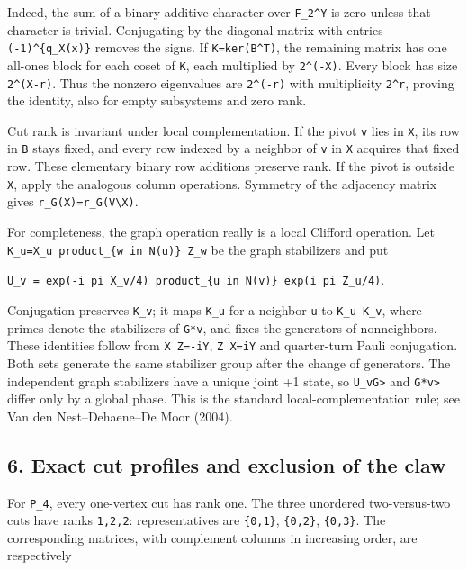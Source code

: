 \documentclass[
  11pt,
]{article}
\begin{document}
Indeed, the sum of a binary additive character over \texttt{F\_2\^{}Y}
is zero unless that character is trivial. Conjugating by the diagonal
matrix with entries \texttt{(-1)\^{}\{q\_X(x)\}} removes the signs. If
\texttt{K=ker(B\^{}T)}, the remaining matrix has one all-ones block for
each coset of \texttt{K}, each multiplied by
\texttt{2\^{}(-\textbar{}X\textbar{})}. Every block has size
\texttt{2\^{}(\textbar{}X\textbar{}-r)}. Thus the nonzero eigenvalues
are \texttt{2\^{}(-r)} with multiplicity \texttt{2\^{}r}, proving the
identity, also for empty subsystems and zero rank.

Cut rank is invariant under local complementation. If the pivot
\texttt{v} lies in \texttt{X}, its row in \texttt{B} stays fixed, and
every row indexed by a neighbor of \texttt{v} in \texttt{X} acquires
that fixed row. These elementary binary row additions preserve rank. If
the pivot is outside \texttt{X}, apply the analogous column operations.
Symmetry of the adjacency matrix gives
\texttt{r\_G(X)=r\_G(V\textbackslash{}X)}.

For completeness, the graph operation really is a local Clifford
operation. Let \texttt{K\_u=X\_u\ product\_\{w\ in\ N(u)\}\ Z\_w} be the
graph stabilizers and put

\texttt{U\_v\ =\ exp(-i\ pi\ X\_v/4)\ product\_\{u\ in\ N(v)\}\ exp(i\ pi\ Z\_u/4)}.

Conjugation preserves \texttt{K\_v}; it maps \texttt{K\_u} for a
neighbor \texttt{u} to
\texttt{K\textquotesingle{}\_u\ K\textquotesingle{}\_v}, where primes
denote the stabilizers of \texttt{G*v}, and fixes the generators of
nonneighbors. These identities follow from \texttt{X\ Z=-iY},
\texttt{Z\ X=iY} and quarter-turn Pauli conjugation. Both sets generate
the same stabilizer group after the change of generators. The
independent graph stabilizers have a unique joint +1 state, so
\texttt{U\_v\textbar{}G\textgreater{}} and
\texttt{\textbar{}G*v\textgreater{}} differ only by a global phase. This
is the standard local-complementation rule; see Van den
Nest--Dehaene--De Moor (2004).

\subsection{6. Exact cut profiles and exclusion of the
claw}\label{exact-cut-profiles-and-exclusion-of-the-claw}

For \texttt{P\_4}, every one-vertex cut has rank one. The three
unordered two-versus-two cuts have ranks \texttt{1,2,2}: representatives
are \texttt{\{0,1\}}, \texttt{\{0,2\}}, \texttt{\{0,3\}}. The
corresponding matrices, with complement columns in increasing order, are
respectively
\end{document}
